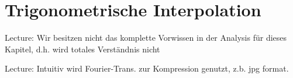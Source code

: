 \newsection
\section{Trigonometrische Interpolation}

Lecture: Wir besitzen nicht das komplette Vorwissen in der Analysis für dieses Kapitel, d.h. wird totales Verständnis nicht 

Lecture: Intuitiv wird Fourier-Trans. zur Kompression genutzt, z.b. jpg format.